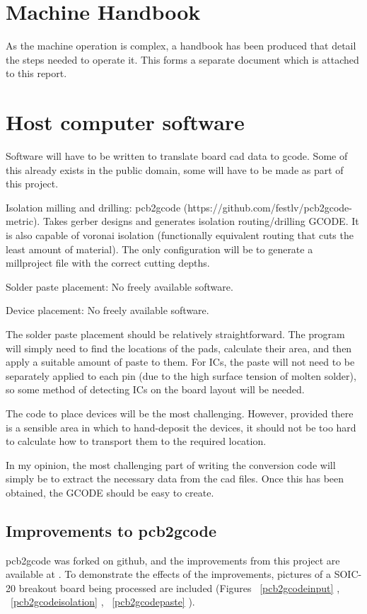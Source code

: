 \section{Machine Handbook}
As the machine operation is complex, a handbook has been produced that
detail the steps needed to operate it. This forms a separate document
which is attached to this report.

\section{Host computer software}
Software will have to be written to translate board cad data to gcode. Some of this already exists in the public domain, some will have to be made
as part of this project.

Isolation milling and drilling: pcb2gcode (https://github.com/festlv/pcb2gcode-metric). Takes gerber designs and generates isolation routing/drilling
GCODE. It is also capable of voronai isolation (functionally equivalent routing that cuts the least amount of material). The only configuration
will be to generate a millproject file with the correct cutting depths.

Solder paste placement: No freely available software.

Device placement: No freely available software.

The solder paste placement should be relatively straightforward. The program will simply need to find the locations of the pads, calculate their
area, and then apply a suitable amount of paste to them. For ICs, the paste will not need to be separately applied to each pin (due to the high
surface tension of molten solder), so some method of detecting ICs on the board layout will be needed.

The code to place devices will be the most challenging. However, provided there is a sensible area in which to hand-deposit the devices, it should
not be too hard to calculate how to transport them to the required location.

In my opinion, the most challenging part of writing the conversion code will simply be to extract the necessary data from the cad files. Once this
has been obtained, the GCODE should be easy to create.

\subsection{Improvements to pcb2gcode}
pcb2gcode was forked on github, and the improvements from this project are available at \cite{github}.
To demonstrate the effects of the improvements, pictures of a SOIC-20 breakout board being processed are included (Figures ~\ref{pcb2gcodeinput} , ~\ref{pcb2gcodeisolation} , ~\ref{pcb2gcodepaste} ).

